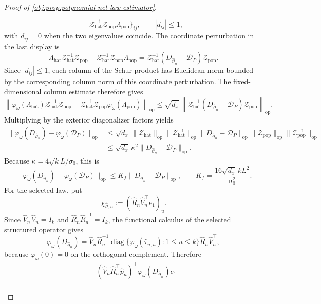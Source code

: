\documentclass[11pt]{article}
\begin{document}
\begin{proof}[Proof of \cref{obj:prop:polynomial-net-law-estimator}]
\begin{enumerate}
\[-\mathcal Z_{\mathrm{hat}}^{-1}\mathcal Z_{\mathrm{pop}}\Lambda_{\mathrm{pop}}\}_{ij},
\qquad |d_{ij}|\le1,
\]
with \(d_{ij}=0\) when the two eigenvalues coincide.  The coordinate perturbation in the last display is
\[
\Lambda_{\mathrm{hat}}\mathcal Z_{\mathrm{hat}}^{-1}\mathcal Z_{\mathrm{pop}}
-\mathcal Z_{\mathrm{hat}}^{-1}\mathcal Z_{\mathrm{pop}}\Lambda_{\mathrm{pop}}
=
\mathcal Z_{\mathrm{hat}}^{-1}
(D_{\widehat\vartheta_n}-\mathcal D_P)
\mathcal Z_{\mathrm{pop}}.
\]
Since \(|d_{ij}|\le1\), each column of the Schur product has Euclidean norm bounded by the corresponding column norm of this coordinate perturbation.  The fixed-dimensional column estimate therefore gives
\[
\left\|
\varphi_\omega(\Lambda_{\mathrm{hat}})\mathcal Z_{\mathrm{hat}}^{-1}\mathcal Z_{\mathrm{pop}}
-\mathcal Z_{\mathrm{hat}}^{-1}\mathcal Z_{\mathrm{pop}}\varphi_\omega(\Lambda_{\mathrm{pop}})
\right\|_{\mathrm{op}}
\le
\sqrt{d_x}\,
\left\|
\mathcal Z_{\mathrm{hat}}^{-1}
(D_{\widehat\vartheta_n}-\mathcal D_P)
\mathcal Z_{\mathrm{pop}}
\right\|_{\mathrm{op}}.
\]
Multiplying by the exterior diagonalizer factors yields
\[
\begin{aligned}
\|\varphi_\omega(D_{\widehat\vartheta_n})-\varphi_\omega(\mathcal D_P)\|_{\mathrm{op}}
&\le
\sqrt{d_x}\,
\|\mathcal Z_{\mathrm{hat}}\|_{\mathrm{op}}
\|\mathcal Z_{\mathrm{hat}}^{-1}\|_{\mathrm{op}}
\|D_{\widehat\vartheta_n}-\mathcal D_P\|_{\mathrm{op}}
\|\mathcal Z_{\mathrm{pop}}\|_{\mathrm{op}}
\|\mathcal Z_{\mathrm{pop}}^{-1}\|_{\mathrm{op}} \\
&\le
\sqrt{d_x}\,\kappa^2
\|D_{\widehat\vartheta_n}-\mathcal D_P\|_{\mathrm{op}}.
\end{aligned}
\]
Because \(\kappa=4\sqrt{k}L/\sigma_0\), this is
\[
\|\varphi_\omega(D_{\widehat\vartheta_n})-\varphi_\omega(\mathcal D_P)\|_{\mathrm{op}}
\le K_f\|D_{\widehat\vartheta_n}-\mathcal D_P\|_{\mathrm{op}},
\qquad
K_f=\frac{16\sqrt{d_x}\,kL^2}{\sigma_0^2}.
\]
For the selected law, put
\[
\chi_{\widehat\vartheta,u}:=(\widehat R_n\widehat V_n^\top e_1)_u .
\]
Since \(\widehat V_n^\top\widehat V_n=I_k\) and \(\widehat R_n\widehat R_n^{-1}=I_k\), the functional calculus of the selected structured operator gives
\[
\varphi_\omega(D_{\widehat\vartheta_n})
=
\widehat V_n\widehat R_n^{-1}
\operatorname{diag}\{\varphi_\omega(\widehat\tau_{n,u}):1\le u\le k\}
\widehat R_n\widehat V_n^\top,
\]
because \(\varphi_\omega(0)=0\) on the orthogonal complement.  Therefore
\[
\begin{aligned}
&(\widehat V_n\widehat R_n^\top\widehat p_n)^\top
\varphi_\omega(D_{\widehat\vartheta_n})e_1 \\

\end{aligned}\]
\end{enumerate}
\end{proof}
\end{document}
